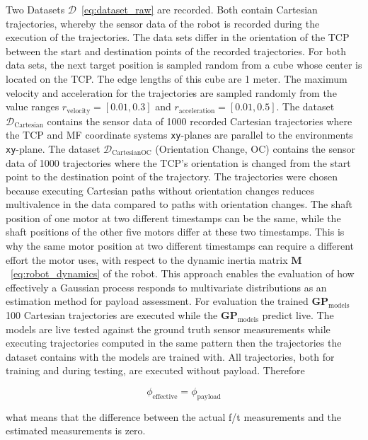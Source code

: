     Two Datasets \(\mathcal{D}\)~\eqref{eq:dataset_raw} are recorded. Both contain Cartesian trajectories, whereby the sensor data of the robot is recorded during the execution of the trajectories. The data sets differ in the orientation of the TCP between the start and destination points of the recorded trajectories. For both data sets, the next target position is sampled random from a cube whose center is located on the TCP. The edge lengths of this cube are 1 meter. The maximum velocity and acceleration for the trajectories are sampled randomly from the value ranges \( r_{\text{velocity}} = [0.01, 0.3] \) and \( r_{\text{acceleration}} = [0.01, 0.5] \). The dataset \(\mathcal{D}_{\text{Cartesian}}\) contains the sensor data of 1000 recorded Cartesian trajectories where the TCP and MF coordinate systems \texttt{xy}-planes are parallel to the environments \texttt{xy}-plane. The dataset \(\mathcal{D}_{\text{CartesianOC}}\) (Orientation Change, OC) contains the sensor data of 1000 trajectories where the TCP's orientation is changed from the start point to the destination point of the trajectory. The trajectories were chosen because executing Cartesian paths without orientation changes reduces multivalence in the data compared to paths with orientation changes. The shaft position of one motor at two different timestamps can be the same, while the shaft positions of the other five motors differ at these two timestamps. This is why the same motor position at two different timestamps can require a different effort the motor uses, with respect to the dynamic inertia matrix \(\boldsymbol{M}\)~\eqref{eq:robot_dynamics} of the robot. This approach enables the evaluation of how effectively a Gaussian process responds to multivariate distributions as an estimation method for payload assessment. For evaluation the trained \(\boldsymbol{GP}_{\text{models}}\) 100 Cartesian trajectories are executed while the \(\boldsymbol{GP}_{\text{models}}\) predict live. The models are live tested against the ground truth sensor measurements while executing trajectories computed in the same pattern then the trajectories the dataset contains with the models are trained with. All trajectories, both for training and during testing, are executed without payload. Therefore 

    \begin{equation}
    \phi_{\text{effective}} = \phi_{\text{payload}}
    \label{eq:isolateGripper}
    \end{equation}
    
    what means that the difference between the actual f/t measurements and the estimated measurements is zero. 

